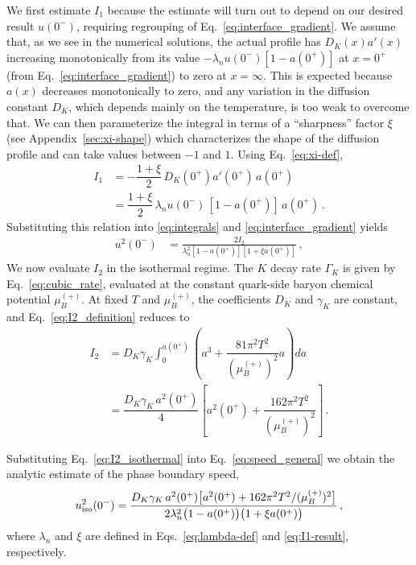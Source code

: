 \documentclass[10pt,superscriptaddress,
amsmath,aps,prc,twocolumn,nofootinbib,floatfix]{revtex4-1}
\newcommand{\mgacom}[1]{\textsf{\color[rgb]{0.8,0,0}[\textsuperscript{MGA} #1]}}
\newcommand{\Ga}{\Gamma}
\newcommand{\dsp}{\displaystyle}
\newcommand{\Bratio}{\lambda_n}
\begin{document}
We first estimate $I_1$ because the estimate will turn out to depend on our desired result $u(0^-)$, requiring regrouping of Eq.~\ref{eq:interface_gradient}.
We assume that, as we see in the numerical solutions, the actual profile has $D_K(x) a'(x)$ increasing monotonically from its value $-\Bratio u(0^-)[1-a(0^+)]$ at $x=0^+$ (from Eq.~\eqref{eq:interface_gradient}) to zero at $x=\infty$.
This is expected because $a(x)$ decreases monotonically to zero, and any variation in the diffusion constant $D_K$, which depends mainly on the temperature, is too weak to overcome that.
We can then parameterize the integral in terms of a ``sharpness'' factor $\xi$ (see Appendix~\ref{sec:xi-shape}) which characterizes the shape of the diffusion profile and can take values between $-1$ and $1$. 
Using Eq.~\eqref{eq:xi-def},
\begin{equation}
\begin{array}{rl}
 I_1 &= -\dfrac{1+\xi}{2}\,D_K(0^+) a'(0^+)\, a(0^+) \\[2ex]
  &= \dfrac{1+\xi}{2}\,
 \Bratio u(0^-)\,[1-a(0^+)]\,a(0^+)\,.
 \end{array}
 \label{eq:I1-result}
\end{equation}
Substituting this relation into \eqref{eq:integrals} and \eqref{eq:interface_gradient} yields
\begin{align}
 u^2(0^-)&= \frac{2 I_2}
 {\Bratio^2[1-a(0^+)][1+\xi a(0^+)]}\,,
\label{eq:speed_general}
\end{align}
%
We now evaluate $I_2$ in the isothermal regime.
The $K$ decay rate $\Ga_K$ is given by Eq.~\eqref{eq:cubic_rate}, evaluated at the constant quark-side baryon chemical potential $\mu_B^{(+)}$.
At fixed $T$ and $\mu_B^{(+)}$, the coefficients $D_K$ and $\gamma_K$ are constant, and Eq.~\eqref{eq:I2_definition} reduces to
\begin{equation}
\begin{array}{rl}
 I_2 &= D_K\gamma_K\dsp\int_0^{a(0^+)}\left(a^3+\dfrac{81\pi^2T^2}{(\mu_B^{(+)})^2}a\right)da \\[4ex]
 &= \dfrac{D_K\gamma_K\,a^2(0^+)}{4}\left[a^2(0^+)+\dfrac{162\pi^2T^2}{(\mu_B^{(+)})^2}\right]\,.
\end{array}
\label{eq:I2_isothermal}
\end{equation}

Substituting Eq.~\eqref{eq:I2_isothermal} into Eq.~\eqref{eq:speed_general} we obtain the analytic estimate of the phase boundary speed,
\begin{equation}
 u_{\rm iso}^2(0^-)=\frac{D_K\gamma_K\,a^2(0^+)\bigl[a^2(0^+)+162\pi^2T^2/(\mu_B^{(+)})^2\bigr]}
 {2\Bratio^2\bigl(1-a(0^+)\bigr)\bigl(1+\xi a(0^+)\bigr)}\,,
\label{eq:speed_isothermal}
\end{equation}
where $\Bratio$ and $\xi$ are defined in Eqs.~\eqref{eq:lambda-def} and \eqref{eq:I1-result}, respectively.
\end{document}
